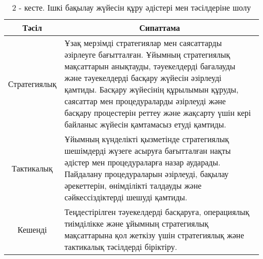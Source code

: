 \begin{table}[H]
\caption*{2 - кесте. Ішкі бақылау жүйесін құру әдістері мен тәсілдеріне шолу}
\centering
\begin{tabular}{|c|p{}|}
\hline
Тәсіл &
  \multicolumn{1}{c|}{Сипаттама} \\ \hline
Стратегиялық &
  Ұзақ мерзімді стратегиялар мен саясаттарды әзірлеуге бағытталған. Ұйымның стратегиялық мақсаттарын анықтауды, тәуекелдерді бағалауды және тәуекелдерді басқару жүйесін әзірлеуді қамтиды. Басқару жүйесінің құрылымын құруды, саясаттар мен процедураларды әзірлеуді және басқару процестерін реттеу және жақсарту үшін кері байланыс жүйесін қамтамасыз етуді қамтиды. \\ \hline
Тактикалық &
  Ұйымның күнделікті қызметінде стратегиялық шешімдерді жүзеге асыруға бағытталған нақты әдістер мен процедураларға назар аударады. Пайдалану процедураларын әзірлеуді, бақылау әрекеттерін, өнімділікті талдауды және сәйкессіздіктерді шешуді қамтиды. \\ \hline
Кешенді &
  Теңдестірілген тәуекелдерді басқаруға, операциялық тиімділікке және ұйымның стратегиялық мақсаттарына қол жеткізу үшін стратегиялық және тактикалық тәсілдерді біріктіру. \\ \hline
\end{tabular}
\end{table}

